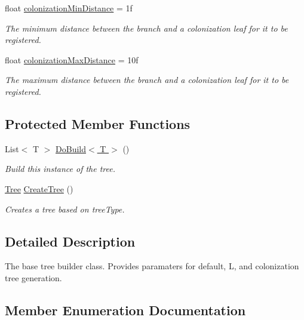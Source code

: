 \begin{DoxyCompactItemize}
float \hyperlink{class_fractal_tree_1_1_tree_builder_ac7abe13cc887bafe266773e33513d69a}{colonization\+Min\+Distance} = 1f
\begin{DoxyCompactList}\small\item\em The minimum distance between the branch and a colonization leaf for it to be registered. \end{DoxyCompactList}\item 
float \hyperlink{class_fractal_tree_1_1_tree_builder_a21cbebdabadaf5d205a038d20db2f702}{colonization\+Max\+Distance} = 10f
\begin{DoxyCompactList}\small\item\em The maximum distance between the branch and a colonization leaf for it to be registered. \end{DoxyCompactList}\end{DoxyCompactItemize}
\subsection*{Protected Member Functions}
\begin{DoxyCompactItemize}
\item 
List$<$ T $>$ \hyperlink{class_fractal_tree_1_1_tree_builder_aa2d0ae2616577e6c0cdf7e68cdf4dffb}{Do\+Build$<$ T $>$} ()
\begin{DoxyCompactList}\small\item\em Build this instance of the tree. \end{DoxyCompactList}\item 
\hyperlink{interface_fractal_tree_1_1_tree}{Tree} \hyperlink{class_fractal_tree_1_1_tree_builder_a8bea11ef52d57a75292efd34e6f40779}{Create\+Tree} ()
\begin{DoxyCompactList}\small\item\em Creates a tree based on tree\+Type. \end{DoxyCompactList}\end{DoxyCompactItemize}


\subsection{Detailed Description}
The base tree builder class. Provides paramaters for default, L, and colonization tree generation. 



\subsection{Member Enumeration Documentation}
\hypertarget{class_fractal_tree_1_1_tree_builder_a955d67cfa976440cc427e591be74f979}{}\label{class_fractal_tree_1_1_tree_builder_a955d67cfa976440cc427e591be74f979} 
